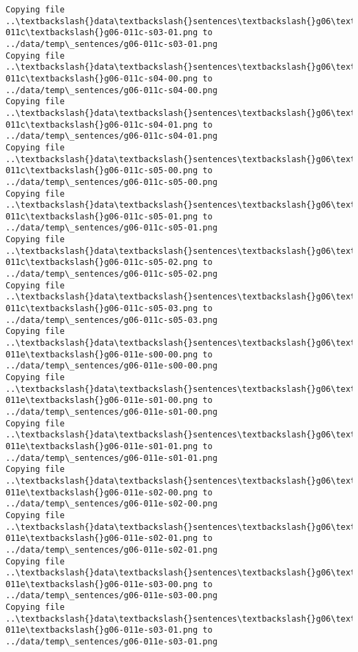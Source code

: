 \documentclass[11pt]{article}
\begin{document}
\begin{Verbatim}[commandchars=\\\{\}]
Copying file ..\textbackslash{}data\textbackslash{}sentences\textbackslash{}g06\textbackslash{}g06-011c\textbackslash{}g06-011c-s03-01.png to
../data/temp\_sentences/g06-011c-s03-01.png
Copying file ..\textbackslash{}data\textbackslash{}sentences\textbackslash{}g06\textbackslash{}g06-011c\textbackslash{}g06-011c-s04-00.png to
../data/temp\_sentences/g06-011c-s04-00.png
Copying file ..\textbackslash{}data\textbackslash{}sentences\textbackslash{}g06\textbackslash{}g06-011c\textbackslash{}g06-011c-s04-01.png to
../data/temp\_sentences/g06-011c-s04-01.png
Copying file ..\textbackslash{}data\textbackslash{}sentences\textbackslash{}g06\textbackslash{}g06-011c\textbackslash{}g06-011c-s05-00.png to
../data/temp\_sentences/g06-011c-s05-00.png
Copying file ..\textbackslash{}data\textbackslash{}sentences\textbackslash{}g06\textbackslash{}g06-011c\textbackslash{}g06-011c-s05-01.png to
../data/temp\_sentences/g06-011c-s05-01.png
Copying file ..\textbackslash{}data\textbackslash{}sentences\textbackslash{}g06\textbackslash{}g06-011c\textbackslash{}g06-011c-s05-02.png to
../data/temp\_sentences/g06-011c-s05-02.png
Copying file ..\textbackslash{}data\textbackslash{}sentences\textbackslash{}g06\textbackslash{}g06-011c\textbackslash{}g06-011c-s05-03.png to
../data/temp\_sentences/g06-011c-s05-03.png
Copying file ..\textbackslash{}data\textbackslash{}sentences\textbackslash{}g06\textbackslash{}g06-011e\textbackslash{}g06-011e-s00-00.png to
../data/temp\_sentences/g06-011e-s00-00.png
Copying file ..\textbackslash{}data\textbackslash{}sentences\textbackslash{}g06\textbackslash{}g06-011e\textbackslash{}g06-011e-s01-00.png to
../data/temp\_sentences/g06-011e-s01-00.png
Copying file ..\textbackslash{}data\textbackslash{}sentences\textbackslash{}g06\textbackslash{}g06-011e\textbackslash{}g06-011e-s01-01.png to
../data/temp\_sentences/g06-011e-s01-01.png
Copying file ..\textbackslash{}data\textbackslash{}sentences\textbackslash{}g06\textbackslash{}g06-011e\textbackslash{}g06-011e-s02-00.png to
../data/temp\_sentences/g06-011e-s02-00.png
Copying file ..\textbackslash{}data\textbackslash{}sentences\textbackslash{}g06\textbackslash{}g06-011e\textbackslash{}g06-011e-s02-01.png to
../data/temp\_sentences/g06-011e-s02-01.png
Copying file ..\textbackslash{}data\textbackslash{}sentences\textbackslash{}g06\textbackslash{}g06-011e\textbackslash{}g06-011e-s03-00.png to
../data/temp\_sentences/g06-011e-s03-00.png
Copying file ..\textbackslash{}data\textbackslash{}sentences\textbackslash{}g06\textbackslash{}g06-011e\textbackslash{}g06-011e-s03-01.png to
../data/temp\_sentences/g06-011e-s03-01.png

\end{Verbatim}
\end{document}

